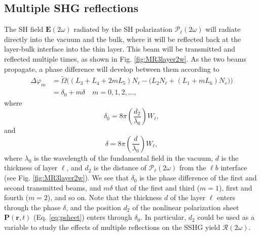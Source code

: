 
\subsection{Multiple SHG reflections}

The SH field $\mathbf{E}(2\omega)$ radiated by the SH polarization
$\boldsymbol{\mathcal{P}}_{\ell}(2\omega)$ will radiate directly into the vacuum
and the bulk, where it will be reflected back at the layer-bulk interface into
the thin layer. This beam will be transmitted and reflected multiple times, as
shown in Fig. \ref{fig:MR3layer2w}. As the two beams propagate, a phase
difference will develop between them according to
\begin{equation}\label{eq:m99}
\begin{split}
\Delta\varphi_{m} 
&= \tilde{\Omega}
\Big(
(L_{3} + L_{4} + 2mL_{5})N_{\ell}
 - \big(L_{2}N_{\ell} + (L_{1} + mL_{6})N_{v}\big)
\Big)\\
&= \delta_{0} + m\delta\quad m=0,1,2,\ldots,
\end{split}
\end{equation}
where
\begin{equation}\label{eq:delta0}
\delta_{0} =
8\pi\left(\frac{d_{2}}{\lambda_{0}}\right)W_{\ell},
\end{equation}
and
\begin{equation}\label{eq:delta}
\delta = 8\pi
\left(\frac{d}{\lambda_{0}}\right)W_{\ell},
\end{equation}
where $\lambda_{0}$ is the wavelength of the fundamental field in the vacuum,
$d$ is the thickness of layer $\ell$, and $d_{2}$ is the distance of
$\boldsymbol{\mathcal{P}}_{\ell}(2\omega)$ from the $\ell b$ interface (see Fig.
\ref{fig:MR3layer2w}). We see that $\delta_{0}$ is the phase difference of the
first and second transmitted beams, and $m\delta$ that of the first and third
($m = 1$), first and fourth ($m = 2$), and so on. Note that the thickness $d$ of
the layer $\ell$ enters through the phase $\delta$, and the position $d_{2}$ of
the nonlinear polarization sheet $\mathbf{P}(\mathbf{r},t)$ (Eq.
\eqref{eq:psheet}) enters through $\delta_{0}$. In particular, $d_{2}$ could be
used as a variable to study the effects of multiple reflections on the SSHG
yield $\mathcal{R}(2\omega)$.

